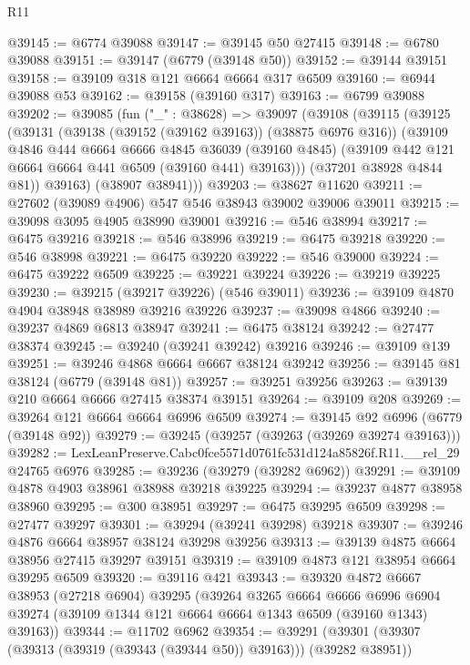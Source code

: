 \begin{lexlean}{R11}
\begin{coremodule}
@39145 := @6774 @39088
@39147 := @39145 @50 @27415
@39148 := @6780 @39088
@39151 := @39147 (@6779 (@39148 @50))
@39152 := @39144 @39151
@39158 := @39109 @318 @121 @6664 @6664 @317 @6509
@39160 := @6944 @39088 @53
@39162 := @39158 (@39160 @317)
@39163 := @6799 @39088
@39202 := @39085
    (fun ("_" : @38628) =>
    @39097
      (@39108
        (@39115
          (@39125
            (@39131
              (@39138 (@39152 (@39162 @39163)) (@38875 @6976 @316))
              (@39109
                @4846
                @444
                @6664
                @6666
                @4845
                @36039
                (@39160 @4845)
                (@39109 @442 @121 @6664 @6664 @441 @6509 (@39160 @441) @39163)))
            (@37201 @38928 @4844 @81))
          @39163)
        (@38907 @38941)))
@39203 := @38627 @11620
@39211 := @27602 (@39089 @4906) @547 @546 @38943 @39002 @39006 @39011
@39215 := @39098 @3095 @4905 @38990 @39001
@39216 := @546 @38994
@39217 := @6475 @39216
@39218 := @546 @38996
@39219 := @6475 @39218
@39220 := @546 @38998
@39221 := @6475 @39220
@39222 := @546 @39000
@39224 := @6475 @39222 @6509
@39225 := @39221 @39224
@39226 := @39219 @39225
@39230 := @39215 (@39217 @39226) (@546 @39011)
@39236 := @39109 @4870 @4904 @38948 @38989 @39216 @39226
@39237 := @39098 @4866
@39240 := @39237 @4869 @6813 @38947
@39241 := @6475 @38124
@39242 := @27477 @38374
@39245 := @39240 (@39241 @39242) @39216
@39246 := @39109 @139
@39251 := @39246 @4868 @6664 @6667 @38124 @39242
@39256 := @39145 @81 @38124 (@6779 (@39148 @81))
@39257 := @39251 @39256
@39263 := @39139 @210 @6664 @6666 @27415 @38374 @39151
@39264 := @39109 @208
@39269 := @39264 @121 @6664 @6664 @6996 @6509
@39274 := @39145 @92 @6996 (@6779 (@39148 @92))
@39279 := @39245 (@39257 (@39263 (@39269 @39274 @39163)))
@39282 := LexLeanPreserve.Cabc0fce5571d0761fc531d124a85826f.R11.__rel_29 @24765 @6976
@39285 := @39236 (@39279 (@39282 @6962))
@39291 := @39109 @4878 @4903 @38961 @38988 @39218 @39225
@39294 := @39237 @4877 @38958 @38960
@39295 := @300 @38951
@39297 := @6475 @39295 @6509
@39298 := @27477 @39297
@39301 := @39294 (@39241 @39298) @39218
@39307 := @39246 @4876 @6664 @38957 @38124 @39298 @39256
@39313 := @39139 @4875 @6664 @38956 @27415 @39297 @39151
@39319 := @39109 @4873 @121 @38954 @6664 @39295 @6509
@39320 := @39116 @421
@39343 := @39320
    @4872
    @6667
    @38953
    (@27218 @6904)
    @39295
    (@39264
      @3265
      @6664
      @6666
      @6996
      @6904
      @39274
      (@39109 @1344 @121 @6664 @6664 @1343 @6509 (@39160 @1343) @39163))
@39344 := @11702 @6962
@39354 := @39291 (@39301 (@39307 (@39313 (@39319 (@39343 (@39344 @50)) @39163))) (@39282 @38951))

\end{coremodule}
\end{lexlean}

